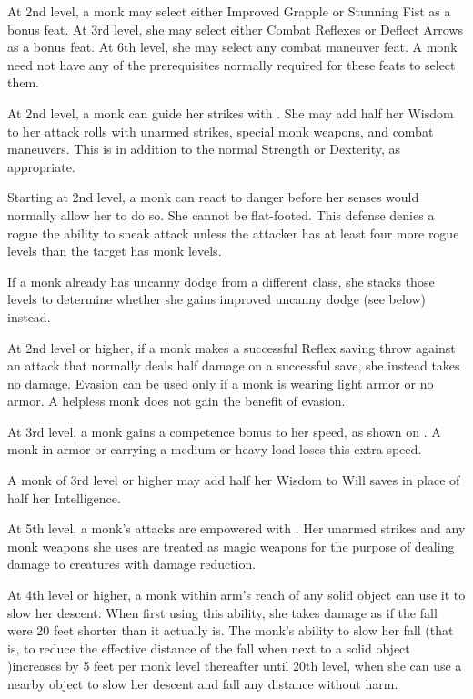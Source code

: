  At 2nd level, a monk may select either Improved Grapple or Stunning Fist as a bonus feat. At 3rd level, she may select either Combat Reflexes or Deflect Arrows as a bonus feat. At 6th level, she may select any combat maneuver feat. A monk need not have any of the prerequisites normally required for these feats to select them.

 At 2nd level, a monk can guide her strikes with \ki. She may add half her Wisdom to her attack rolls with unarmed strikes, special monk weapons, and combat maneuvers. This is in addition to the normal Strength or Dexterity, as appropriate.

 Starting at 2nd level, a monk can react to danger before her senses would normally allow her to do so. She cannot be flat-footed. This defense denies a rogue the ability to sneak attack unless the attacker has at least four more rogue levels than the target has monk levels.

If a monk already has uncanny dodge from a different class, she stacks those levels to determine whether she gains improved uncanny dodge (see below) instead.

 At 2nd level or higher, if a monk makes a successful Reflex saving throw against an attack that normally deals half damage on a successful save, she instead takes no damage. Evasion can be used only if a monk is wearing light armor or no armor. A helpless monk does not gain the benefit of evasion.

 At 3rd level, a monk gains a competence bonus to her speed, as shown on . A monk in armor or carrying a medium or heavy load loses this extra speed.

 A monk of 3rd level or higher may add half her Wisdom to Will saves in place of half her Intelligence.

 At 5th level, a monk's attacks are empowered with \ki. Her unarmed strikes and any monk weapons she uses are treated as magic weapons for the purpose of dealing damage to creatures with damage reduction.

  At 4th level or higher, a monk within arm's reach of any solid object can use it to slow her descent. When first using this ability, she takes damage as if the fall were 20 feet shorter than it actually is. The monk's ability to slow her fall (that is, to reduce the effective distance of the fall when next to a solid object )increases by 5 feet per monk level thereafter until 20th level, when she can use a nearby object to slow her descent and fall any distance without harm.

